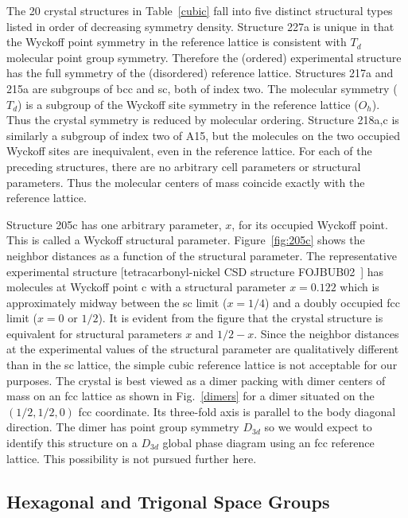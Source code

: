 \documentclass[preprint]{revtex4}              %
\begin{document}
The 20 crystal structures in Table~\ref{cubic} fall into five
distinct structural types listed in order of decreasing symmetry
density. Structure 227a is unique in that the Wyckoff point symmetry
in the reference lattice is consistent with $T_d$ molecular point
group symmetry. Therefore the (ordered) experimental structure has
the full symmetry of the (disordered) reference lattice. Structures
217a and 215a are subgroups of bcc and sc, both of index two. The
molecular symmetry ($T_d$) is a subgroup of the Wyckoff site
symmetry in the reference lattice ($O_h$). Thus the crystal symmetry
is reduced by molecular ordering. Structure 218a,c is similarly a
subgroup of index two of A15, but the molecules on the two occupied
Wyckoff sites are inequivalent, even in the reference lattice.  For
each of the preceding structures, there are no arbitrary cell
parameters or structural parameters. Thus the molecular centers of
mass coincide exactly with the reference lattice.

Structure 205c has one arbitrary parameter, $x$, for its occupied
Wyckoff point.  This is called a Wyckoff structural parameter.
Figure~\ref{fig:205c} shows the neighbor distances as a function of
the structural parameter. The representative experimental structure
[tetracarbonyl-nickel CSD structure FOJBUB02~\cite{Braga93}] has
molecules at Wyckoff point c with a structural parameter $x=0.122$
which is approximately midway between the sc limit ($x=1/4$) and a
doubly occupied fcc limit ($x=0$ or $1/2$). It is evident from the
figure that the crystal structure is equivalent for structural
parameters $x$ and $1/2-x$. Since the neighbor distances at the
experimental values of the structural parameter are qualitatively
different than in the sc lattice, the simple cubic reference lattice
is not acceptable for our purposes. The crystal is best viewed as a
dimer packing with dimer centers of mass on an fcc lattice as shown
in Fig.~\ref{dimers} for a dimer situated on the $(1/2,1/2,0)$ fcc
coordinate. Its three-fold axis is parallel to the body diagonal
direction. The dimer has point group symmetry $D_{3d}$ so we would
expect to identify this structure on a $D_{3d}$ global phase diagram
using an fcc reference lattice. This possibility is not pursued
further here.

\subsection{Hexagonal and Trigonal Space Groups}
\end{document}
